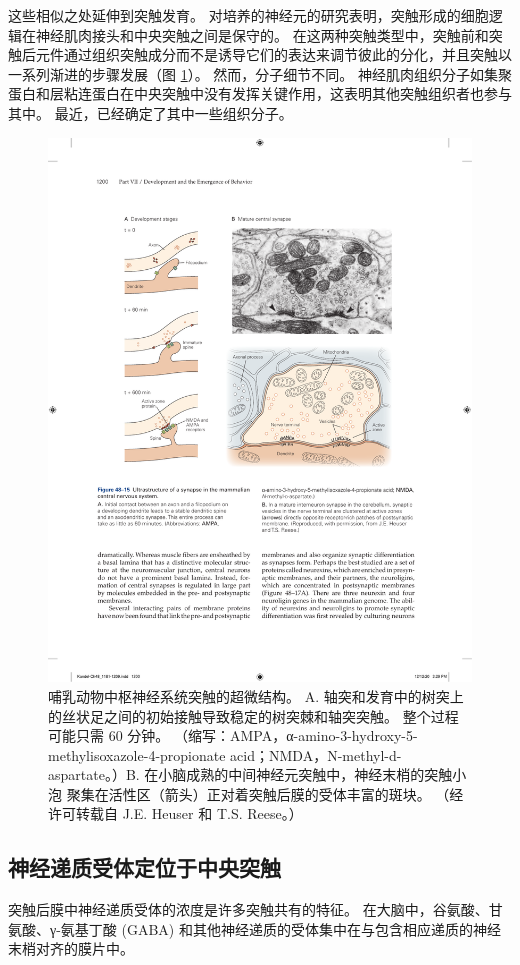 这些相似之处延伸到突触发育。 对培养的神经元的研究表明，突触形成的细胞逻辑在神经肌肉接头和中央突触之间是保守的。 
在这两种突触类型中，突触前和突触后元件通过组织突触成分而不是诱导它们的表达来调节彼此的分化，并且突触以一系列渐进的步骤发展（图 \ref{fig:48_15}）。 
然而，分子细节不同。 神经肌肉组织分子如集聚蛋白和层粘连蛋白在中央突触中没有发挥关键作用，这表明其他突触组织者也参与其中。 最近，已经确定了其中一些组织分子。

\begin{figure}[htbp]
	\centering
	\includegraphics[width=0.75\linewidth]{chap48/fig_48_15}
	\caption{哺乳动物中枢神经系统突触的超微结构。 A. 轴突和发育中的树突上的丝状足之间的初始接触导致稳定的树突棘和轴突突触。 整个过程可能只需 60 分钟。 （缩写：AMPA，α-amino-3-hydroxy-5-methylisoxazole-4-propionate acid；NMDA，N-methyl-d-aspartate。）B. 在小脑成熟的中间神经元突触中，神经末梢的突触小泡 聚集在活性区（箭头）正对着突触后膜的受体丰富的斑块。 （经许可转载自 J.E. Heuser 和 T.S. Reese。）}
	\label{fig:48_15}
\end{figure}

\subsection{神经递质受体定位于中央突触}
突触后膜中神经递质受体的浓度是许多突触共有的特征。 在大脑中，谷氨酸、甘氨酸、γ-氨基丁酸 (GABA) 和其他神经递质的受体集中在与包含相应递质的神经末梢对齐的膜片中。

